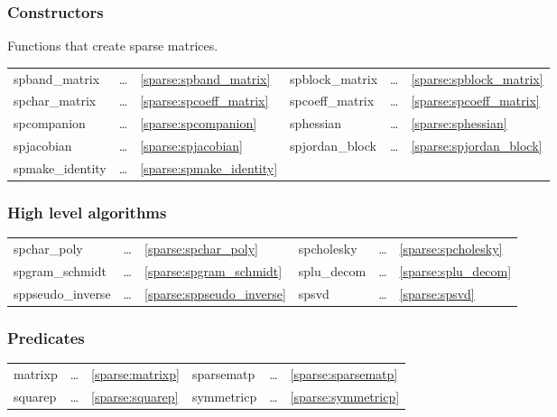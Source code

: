 \subsubsection{Constructors}

Functions that create sparse matrices.

\begin{center}
\begin{tabular}{l l l l l l}
spband\_matrix       & \ldots & \ref{sparse:spband_matrix} &
spblock\_matrix      & \ldots & \ref{sparse:spblock_matrix} \\
spchar\_matrix       & \ldots & \ref{sparse:spcoeff_matrix} &
spcoeff\_matrix      & \ldots & \ref{sparse:spcoeff_matrix} \\
spcompanion          & \ldots & \ref{sparse:spcompanion} &
sphessian            & \ldots & \ref{sparse:sphessian} \\
spjacobian           & \ldots & \ref{sparse:spjacobian} &
spjordan\_block      & \ldots & \ref{sparse:spjordan_block} \\
spmake\_identity     & \ldots & \ref{sparse:spmake_identity} &
\end{tabular}
\end{center}

\subsubsection{High level algorithms}

\begin{center}
\begin{tabular}{l l l l l l}
spchar\_poly       & \ldots & \ref{sparse:spchar_poly} &
spcholesky         & \ldots & \ref{sparse:spcholesky} \\
spgram\_schmidt    & \ldots & \ref{sparse:spgram_schmidt} &
splu\_decom        & \ldots & \ref{sparse:splu_decom} \\
sppseudo\_inverse  & \ldots & \ref{sparse:sppseudo_inverse} &
spsvd              & \ldots & \ref{sparse:spsvd}
\end{tabular}
\end{center}

\subsubsection{Predicates}

\begin{center}
\begin{tabular}{l l l l l l}
matrixp     & \ldots & \ref{sparse:matrixp} &
sparsematp  & \ldots & \ref{sparse:sparsematp} \\
squarep     & \ldots & \ref{sparse:squarep} &
symmetricp  & \ldots & \ref{sparse:symmetricp}
\end{tabular}
\end{center}

